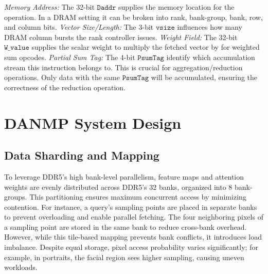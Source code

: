 \documentclass[sigconf]{acmart}
\begin{document}
\textit{Memory Address:} The 32-bit $\mathtt{Daddr}$ supplies the memory location for the operation. In a DRAM setting it can be broken into rank, bank-group, bank, row, and column bits. \textit{Vector Size/Length:} The 3-bit $\mathtt{vsize}$ influences how many DRAM column bursts the rank controller issues. \textit{Weight Field:} The 32-bit $\mathtt{W\_value}$ supplies the scalar weight to multiply the fetched vector by for weighted sum opcodes. \textit{Partial Sum Tag:} The 4-bit $\mathtt{PsumTag}$ identify which accumulation stream this instruction belongs to. This is crucial for aggregation/reduction operations. Only data with the same $\mathtt{PsumTag}$ will be accumulated, ensuring the correctness of the reduction operation.





\section{DANMP System Design}
\label{system}

\subsection{Data Sharding and Mapping}
\label{sharding}
To leverage DDR5’s high bank-level parallelism, feature maps and attention weights are evenly distributed across DDR5’s 32 banks, organized into 8 bank-groups. This partitioning ensures maximum concurrent access by minimizing contention. For instance, a query's sampling points are placed in separate banks to prevent overloading and enable parallel fetching. The four neighboring pixels of a sampling point are stored in the same bank to reduce cross-bank overhead. However, while this tile-based mapping prevents bank conflicts, it introduces load imbalance. Despite equal storage, pixel access probability varies significantly; for example, in portraits, the facial region sees higher sampling, causing uneven workloads.
\end{document}
